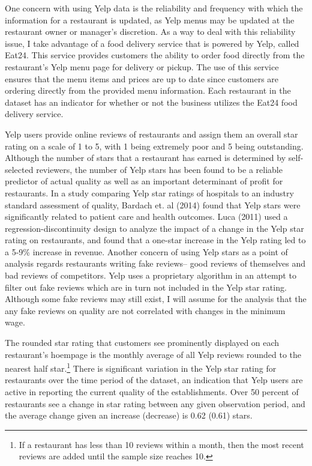 \documentclass[11pt]{article}
\begin{document}
One concern with using Yelp data is the reliability and frequency with which the information for a restaurant is updated, as Yelp menus may be updated at the restaurant owner or manager's discretion. As a way to deal with this reliability issue, I take advantage of a food delivery service that is powered by Yelp, called Eat24. This service provides customers the ability to order food directly from the restaurant's Yelp menu page for delivery or pickup. The use of this service ensures that the menu items and prices are up to date since customers are ordering directly from the provided menu information. Each restaurant in the dataset has an indicator for whether or not the business utilizes the Eat24 food delivery service. 

Yelp users provide online reviews of restaurants and assign them an overall star rating on a scale of 1 to 5, with 1 being extremely poor and 5 being outstanding. Although the number of stars that a restaurant has earned is determined by self-selected reviewers, the number of Yelp stars has been found to be a reliable predictor of actual quality as well as an important determinant of profit for restaurants. In a study comparing Yelp star ratings of hospitals to an industry standard assessment of quality, Bardach et. al (2014) found that Yelp stars were significantly related to patient care and health outcomes. Luca (2011) used a regression-discontinuity design to analyze the impact of a change in the Yelp star rating on restaurants, and found that a one-star increase in the Yelp rating led to a 5-9\% increase in revenue. Another concern of using Yelp stars as a point of analysis regards restaurants writing fake reviews-- good reviews of themselves and bad reviews of competitors. Yelp uses a proprietary algorithm in an attempt to filter out fake reviews which are in turn not included in the Yelp star rating. Although some fake reviews may still exist, I will assume for the analysis that the any fake reviews on quality are not correlated with changes in the minimum wage. 

The rounded star rating that customers see prominently displayed on each restaurant's hoempage is the monthly average of all Yelp reviews rounded to the nearest half star.\footnote{If a restaurant has less than 10 reviews within a month, then the most recent reviews are added until the sample size reaches 10.} There is significant variation in the Yelp star rating for restaurants over the time period of the dataset, an indication that Yelp users are active in reporting the current quality of the establishments. Over 50 percent of restaurants see a change in star rating between any given observation period, and the average change given an increase (decrease) is 0.62 (0.61) stars.
\end{document}
